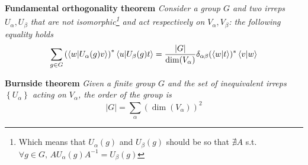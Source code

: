 \textbf{Fundamental orthogonality theorem} \textit{Consider a group $G$ and two
irreps $U_\alpha,U_\beta$ that are not isomorphic\footnote{Which means that
$U_\alpha(g)$ and $U_\beta(g)$ should be so that $\nexists A$ s.t. $\forall
g\in G,\,AU_\alpha(g)A^{-1}=U_\beta(g)$} and act respectively on
$V_\alpha,V_\beta$: the following equality holds}
$$\sum_{g\in G}^{}\left(\bra{w}\ket{U_\alpha(g)v}\right)^*\bra{u}\ket{U_\beta(g)
t} = \frac{|G|}{\dim(V_\alpha)}\delta_{\alpha\beta}(\bra{w}\ket{t})^*\bra{v}
\ket{w}$$

\textbf{Burnside theorem} \textit{Given a finite group $G$ and the set of
inequivalent irreps $\left\{U_\alpha\right\}$ acting on $V_\alpha$, the order
of the group is}
$$|G|=\sum_{\alpha}^{}(\dim(V_\alpha))^2$$
